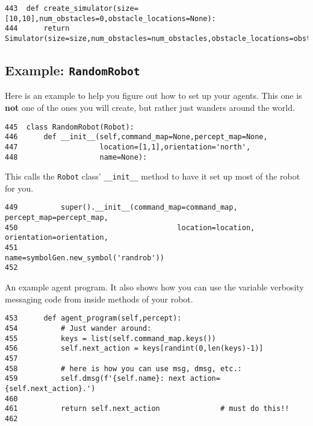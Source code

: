 \documentclass[11pt]{tufte-handout}
\begin{document}
\begin{verbatim}
443  def create_simulator(size=[10,10],num_obstacles=0,obstacle_locations=None):
444      return Simulator(size=size,num_obstacles=num_obstacles,obstacle_locations=obstacle_locations)
\end{verbatim}

\subsection{Example: \texttt{RandomRobot}}
\label{sec:org9386e2f}

Here is an example to help you figure out how to set up your agents.  This one is \textbf{not} one of the ones you will create, but rather just wanders around the world.

\begin{verbatim}
445  class RandomRobot(Robot):
446      def __init__(self,command_map=None,percept_map=None,
447                   location=[1,1],orientation='north',
448                   name=None):
\end{verbatim}

This calls the \texttt{Robot} class' \texttt{\_\_init\_\_} method to have it set up most of the robot for you.
\begin{verbatim}
449          super().__init__(command_map=command_map, percept_map=percept_map,
450                                     location=location, orientation=orientation,
451                                     name=symbolGen.new_symbol('randrob'))
452  
\end{verbatim}

An example agent program.  It also shows how you can use the variable verbosity messaging code from inside methods of your robot.

\begin{verbatim}
453      def agent_program(self,percept):
454          # Just wander around:
455          keys = list(self.command_map.keys())
456          self.next_action = keys[randint(0,len(keys)-1)]
457  
458          # here is how you can use msg, dmsg, etc.:
459          self.dmsg(f'{self.name}: next action={self.next_action}.')
460  
461          return self.next_action              # must do this!!
462  
\end{verbatim}
\end{document}
